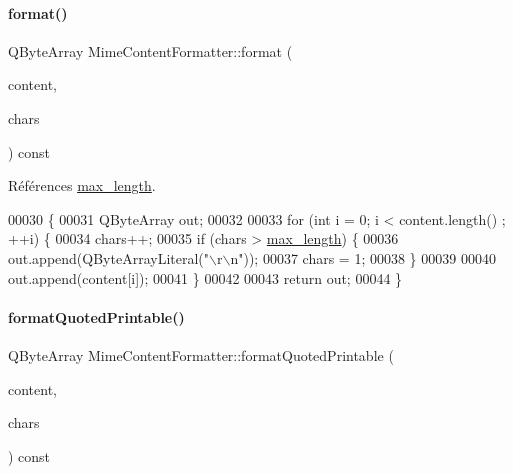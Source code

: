 \paragraph{\texorpdfstring{format()}{format()}}
{\footnotesize\ttfamily Q\+Byte\+Array Mime\+Content\+Formatter\+::format (\begin{DoxyParamCaption}\item[{const Q\+Byte\+Array \&}]{content,  }\item[{int \&}]{chars }\end{DoxyParamCaption}) const}



Références \hyperlink{class_simple_mail_1_1_mime_content_formatter_a5c7278fb3bd794bc4ff408169cfef6fd}{max\+\_\+length}.


\begin{DoxyCode}
00030 \{
00031     QByteArray out;
00032 
00033     \textcolor{keywordflow}{for} (\textcolor{keywordtype}{int} i = 0; i < content.length() ; ++i) \{
00034         chars++;
00035         \textcolor{keywordflow}{if} (chars > \hyperlink{class_simple_mail_1_1_mime_content_formatter_a5c7278fb3bd794bc4ff408169cfef6fd}{max\_length}) \{
00036             out.append(QByteArrayLiteral(\textcolor{stringliteral}{"\(\backslash\)r\(\backslash\)n"}));
00037             chars = 1;
00038         \}
00039 
00040         out.append(content[i]);
00041     \}
00042 
00043     \textcolor{keywordflow}{return} out;
00044 \}
\end{DoxyCode}
\mbox{\label{class_simple_mail_1_1_mime_content_formatter_ae1f9eff05be2538bf6b3210fbab4b75a}} 
\paragraph{\texorpdfstring{format\+Quoted\+Printable()}{formatQuotedPrintable()}}
{\footnotesize\ttfamily Q\+Byte\+Array Mime\+Content\+Formatter\+::format\+Quoted\+Printable (\begin{DoxyParamCaption}\item[{const Q\+Byte\+Array \&}]{content,  }\item[{int \&}]{chars }\end{DoxyParamCaption}) const}



